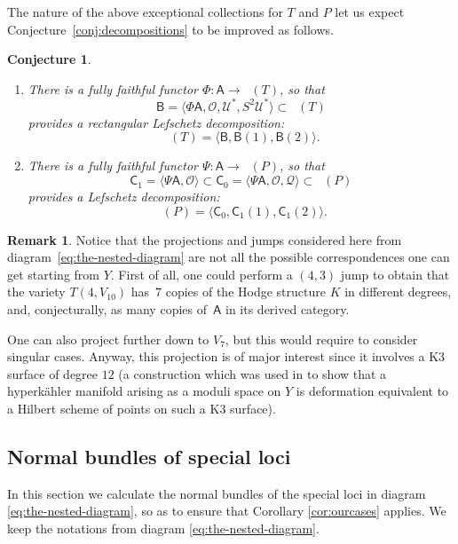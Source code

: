 \documentclass[JEP,XML,SOM,Unicode,NoEqCountersInSection]{cedram}
\let\mathcal\mathscr
\theoremstyle{plain}
\newtheorem{conjecture}[theorem]{Conjecture}
\theoremstyle{definition}
\newtheorem{remark}[theorem]{Remark}
\newcommand{\cat}[1]{\mathsf{#1}}
\newcommand{\sod}[1]{\langle #1 \rangle}
\DeclareMathOperator{\Db}{{\cat{D}^{\mathrm{b}}}}
\newcommand{\sheaf}[1]{\mathcal{#1}}
\newcommand{\ko}{\sheaf{O}}\let\OO\ko\let\cO\ko
\newcommand{\kq}{\sheaf{Q}}
\newcommand{\ku}{\sheaf{U}}
\renewcommand{\theenumi}{\alph{enumi}}
\begin{document}
The nature of the above exceptional collections for $T$ and $P$ let us expect Conjecture~\ref{conj:decompositions}
to be improved as follows.

\skpt
\begin{conjecture}\label{conj:deco-improved}
\begin{enumerate}\renewcommand{\theenumi}{\Alph{enumi}}
\setcounter{enumi}{19}\item\label{enum:T}
There is a fully faithful functor $\Phi: \cat{A} \to \Db(T)$, so that\vspace*{-3pt}
\[
\cat{B}=\sod{\Phi \cat{A},\ko,\ku^*,S^2\ku^*} \subset \Db(T)
\]
provides a rectangular Lefschetz decomposition:\vspace*{-3pt}
\[
\Db(T)=\sod{\cat{B},\cat{B}(1),\cat{B}(2)}.
\]

\setcounter{enumi}{15}\item\label{enum:P}
There is a fully faithful functor $\Psi: \cat{A} \to \Db(P)$, so that\vspace*{-3pt}
\[
\cat{C}_1=\sod{\Psi \cat{A}, \ko} \subset \cat{C}_0 = \sod{\Psi\cat{A},\cO, \kq} \subset \Db(P)
\]
provides a Lefschetz decomposition:\vspace*{-3pt}
\[
\Db(P) = \sod{\cat{C}_0,\cat{C}_1(1),\cat{C}_1(2)}.
\]
\end{enumerate}
\end{conjecture}

\begin{remark}
Notice that the projections and jumps considered here from diagram~\eqref{eq:the-nested-diagram}
are not all the possible correspondences one can get starting from $Y$. First of all, one
could perform a $(4,3)$ jump to obtain that the variety $T(4,V_{10})$ has~$7$ copies
of the Hodge structure $K$ in different degrees, and, conjecturally, as many
copies of~$\cat{A}$ in its derived category.

One can also project further down to $V_7$, but this would require to consider singular cases.
Anyway, this projection is of major interest since it involves a K3 surface of degree $12$
(a construction which was used in \cite{debarre-voisin} to show that a hyperkähler manifold
arising as a moduli space on $Y$
is deformation equivalent to a Hilbert scheme of points on such a K3 surface).
\end{remark}

\subsection{Normal bundles of special loci}
In this section we calculate the normal bundles of the special loci in diagram
\eqref{eq:the-nested-diagram}, so as to ensure that Corollary \ref{cor:ourcases} applies.
We keep the notations from diagram \eqref{eq:the-nested-diagram}.
\end{document}

